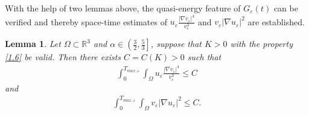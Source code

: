 \documentclass[12pt]{article}
\theoremstyle{plain}
\newtheorem{lemma}{Lemma}[section]
\theoremstyle{definition}
\numberwithin{equation}{section}
\begin{document}
With the help of  two lemmas above, the quasi-energy feature of $G_{\varepsilon}(t)$ can be verified and thereby  space-time estimates of  $u_{\varepsilon}\frac{|\nabla v_{\varepsilon}|^4}{v_{\varepsilon}^{3}} $ and $v_{\varepsilon}|\nabla u_{\varepsilon}|^2$ are established.
\begin{lemma} \label{lemma3.3}
Let $\Omega \subset \mathbb R^3$ and $\alpha\in\left(\frac{3}{2},\frac{5}{3}\right]$, suppose that $K>0$ with the
property \eqref{1.6} be valid. Then there exists $C=C(K)>0$ such that
\begin{align}\label{3.5}
    \int_0^{T_{max,\varepsilon}}\int_{\Omega}u_{\varepsilon}\frac{|\nabla v_{\varepsilon}|^4}{v_{\varepsilon}^{3}}\leq C
\end{align}
and
\begin{align}\label{3.6}
    \int_0^{T_{max,\varepsilon}}\int_{\Omega}v_{\varepsilon}|\nabla u_{\varepsilon}|^2\leq C.
\end{align}
\end{lemma}
\end{document}
